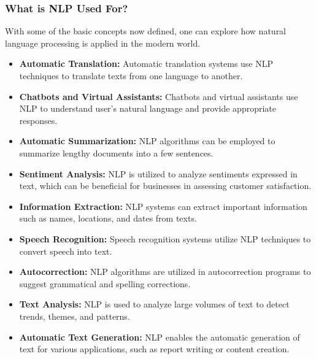 \subsubsection*{What is NLP Used For?}

With some of the basic concepts now defined, one can explore how natural language processing is applied in the modern world.

\begin{itemize}
    \item \textbf{Automatic Translation:} Automatic translation systems use NLP techniques to translate texts from one language to another.
    \item \textbf{Chatbots and Virtual Assistants:} Chatbots and virtual assistants use NLP to understand user's natural language and provide appropriate responses.
    \item \textbf{Automatic Summarization:} NLP algorithms can be employed to summarize lengthy documents into a few sentences.
    \item \textbf{Sentiment Analysis:} NLP is utilized to analyze sentiments expressed in text, which can be beneficial for businesses in assessing customer satisfaction.
    \item \textbf{Information Extraction:} NLP systems can extract important information such as names, locations, and dates from texts.
    \item \textbf{Speech Recognition:} Speech recognition systems utilize NLP techniques to convert speech into text.
    \item \textbf{Autocorrection:} NLP algorithms are utilized in autocorrection programs to suggest grammatical and spelling corrections.
    \item \textbf{Text Analysis:} NLP is used to analyze large volumes of text to detect trends, themes, and patterns.
    \item \textbf{Automatic Text Generation:} NLP enables the automatic generation of text for various applications, such as report writing or content creation.
\end{itemize}